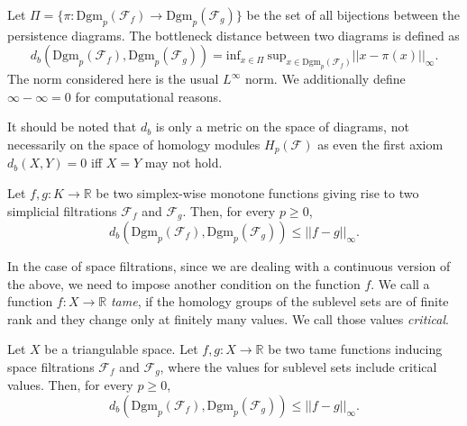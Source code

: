 \begin{definition}
  Let $\Pi = \{\pi: \text{Dgm}_{p}(\mathcal{F}_{f}) \to \text{Dgm}_{p}(\mathcal{F}_{g})\}$ be the set of all bijections between the persistence diagrams. The bottleneck distance between two diagrams is defined as
  \begin{equation*}
    d_{b}(\text{Dgm}_{p}(\mathcal{F}_{f}), \text{Dgm}_{p}(\mathcal{F}_{g})) = \text{inf}_{x \in \Pi} \: \text{sup}_{x \in \text{Dgm}_{p}(\mathcal{F}_{f})} || x - \pi(x)||_{\infty}.
  \end{equation*}
The norm considered here is the usual $L^{\infty}$ norm. We additionally define $\infty - \infty = 0$ for computational reasons.
\end{definition}

It should be noted that $d_{b}$ is only a metric on the space of diagrams, not necessarily on the space of homology modules $H_{p}(\mathcal{F})$ as even the first axiom $d_{b}(X,Y) = 0$ iff $X = Y$ may not hold.

\begin{theorem}
  Let $f,g: K \to \mathbb{R}$ be two simplex-wise monotone functions giving rise to two simplicial filtrations $\mathcal{F}_{f}$ and $\mathcal{F}_{g}$. Then, for every $p \geq 0$,
  \begin{equation*}
    d_{b}(\text{Dgm}_{p}(\mathcal{F}_{f}), \text{Dgm}_{p}(\mathcal{F}_{g})) \leq ||f - g||_{\infty}.
  \end{equation*}
\end{theorem}

In the case of space filtrations, since we are dealing with a continuous version of the above, we need to impose another condition on the function $f$. We call a function $f:X \to \mathbb{R}$ \textit{tame}, if the homology groups of the sublevel sets are of finite rank and they change only at finitely many values. We call those values \textit{critical}.

\begin{theorem}
  Let $X$ be a triangulable space. Let $f,g: X \to \mathbb{R}$ be two tame functions inducing space filtrations $\mathcal{F}_{f}$ and $\mathcal{F}_{g}$, where the values for sublevel sets include critical values. Then, for every $p \geq 0$,
  \begin{equation*}
    d_{b}(\text{Dgm}_{p}(\mathcal{F}_{f}), \text{Dgm}_{p}(\mathcal{F}_{g})) \leq ||f - g||_{\infty}.
  \end{equation*}
\end{theorem}

